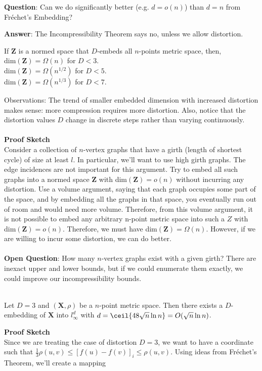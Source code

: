 \textbf{Question}: Can we do significantly better (e.g. $d=o(n)$) than
$d=n$ from Fr\'echet's Embedding?

\textbf{Answer}: The Incompressibility Theorem says no, unless we
allow distortion.

\begin{theorem}
If $\mathbf{Z}$ is a normed space that $D$-embeds all $n$-points
metric space, then,\\ dim$(\mathbf{Z})=\Omega (n)$ for $D<3$.\\ 
dim$(\mathbf{Z})=\Omega (n^{1/2})$ for $D<5$.\\
dim$(\mathbf{Z})=\Omega (n^{1/3})$ for $D<7$.
\end{theorem}
Observations: The trend of smaller embedded dimension with 
increased distortion makes sense: more compression requires 
more distortion. Also, notice that the distortion values $D$
change in discrete steps rather than varying continuously. \\
\\
\textbf{Proof Sketch}\\
Consider a collection of $n$-vertex graphs that have a
girth (length of shortest cycle) of size 
at least $l$. In particular, we'll want to use 
high girth graphs.
The edge incidences are not important for this argument.
Try to embed all such graphs into a normed space $\mathbf{Z}$ with 
dim$(\mathbf{Z})=o(n)$
 without incurring any distortion. 
Use a volume argument, saying that each
graph occupies some part of the space, and by embedding all
the graphs in that space, you eventually run out of room and
would need more volume. Therefore, from this volume argument,
it is not possible to embed any arbitrary n-point metric space
into such a $Z$ with dim$(\mathbf{Z})=o(n)$. 
Therefore, we must have dim$(\mathbf{Z})= \Omega (n)$.
However, if we are willing to incur some distortion, we 
can do better. \\
\\
\textbf{Open Question}: How many $n$-vertex graphs exist 
with a given girth? There are inexact upper and lower
bounds, but if we could enumerate them exactly, we could
improve our incompressibility bounds. \\
\\

\begin{theorem}
Let $D=3$ and $(\mathbf{X},\rho)$ be a $n$-point metric space. Then
there exists a $D$-embedding of $\mathbf{X}$
into $l_\infty^d$ with
$d=\ceil{48\sqrt{n}\ln n}=O(\sqrt{n}\ln n)$.
\end{theorem}
\textbf{Proof Sketch}\\
Since we are treating the case of distortion $D=3$, we want 
to have a coordinate such that 
$\frac{1}{3}\rho(u,v) \leq [f(u)-f(v)]_i
\leq \rho(u,v)$. Using ideas from
Fr\'echet's Theorem, we'll create a mapping

